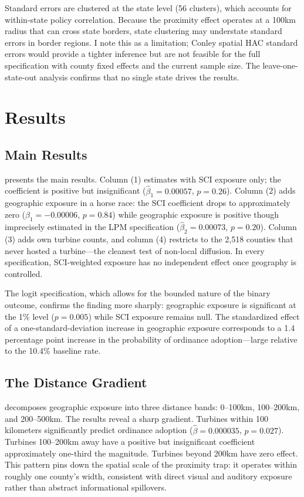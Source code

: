 \documentclass[12pt]{article}
\begin{document}
Standard errors are clustered at the state level (56 clusters), which accounts for within-state policy correlation. Because the proximity effect operates at a 100km radius that can cross state borders, state clustering may understate standard errors in border regions. I note this as a limitation; Conley spatial HAC standard errors would provide a tighter inference but are not feasible for the full specification with county fixed effects and the current sample size. The leave-one-state-out analysis confirms that no single state drives the results.


\section{Results}

\subsection{Main Results}

 presents the main results. Column (1) estimates  with SCI exposure only; the coefficient is positive but insignificant ($\hat{\beta}_1 = 0.00057$, $p = 0.26$). Column (2) adds geographic exposure in a horse race: the SCI coefficient drops to approximately zero ($\hat{\beta}_1 = -0.00006$, $p = 0.84$) while geographic exposure is positive though imprecisely estimated in the LPM specification ($\hat{\beta}_2 = 0.00073$, $p = 0.20$). Column (3) adds own turbine counts, and column (4) restricts to the 2,518 counties that never hosted a turbine---the cleanest test of non-local diffusion. In every specification, SCI-weighted exposure has no independent effect once geography is controlled.

The logit specification, which allows for the bounded nature of the binary outcome, confirms the finding more sharply: geographic exposure is significant at the 1\% level ($p = 0.005$) while SCI exposure remains null. The standardized effect of a one-standard-deviation increase in geographic exposure corresponds to a 1.4 percentage point increase in the probability of ordinance adoption---large relative to the 10.4\% baseline rate.



\subsection{The Distance Gradient}

 decomposes geographic exposure into three distance bands: 0--100km, 100--200km, and 200--500km. The results reveal a sharp gradient. Turbines within 100 kilometers significantly predict ordinance adoption ($\hat{\beta} = 0.000035$, $p = 0.027$). Turbines 100--200km away have a positive but insignificant coefficient approximately one-third the magnitude. Turbines beyond 200km have zero effect. This pattern pins down the spatial scale of the proximity trap: it operates within roughly one county's width, consistent with direct visual and auditory exposure rather than abstract informational spillovers.
\end{document}
